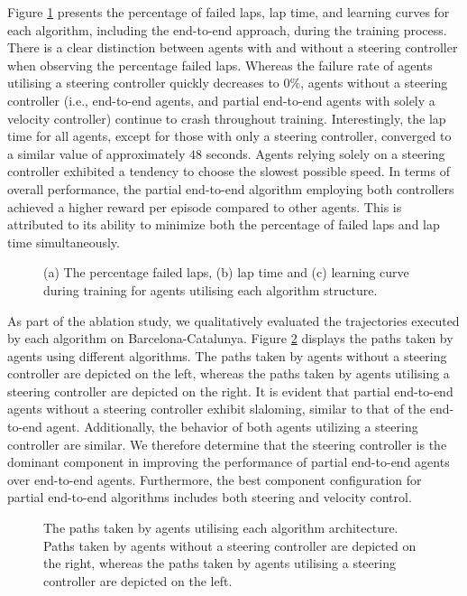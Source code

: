 Figure \ref{fig:architecture_train} presents the percentage of failed laps, lap time, and learning curves for each algorithm, including the end-to-end approach, during the training process.
There is a clear distinction between agents with and without a steering controller when observing the percentage failed laps.
Whereas the failure rate of agents utilising a steering controller quickly decreases to $0\%$, agents without a steering controller (i.e., end-to-end agents, and partial end-to-end agents with solely a velocity controller) continue to crash throughout training.
Interestingly, the lap time for all agents, except for those with only a steering controller, converged to a similar value of approximately $48$ seconds. 
Agents relying solely on a steering controller exhibited a tendency to choose the slowest possible speed.
In terms of overall performance, the partial end-to-end algorithm employing both controllers achieved a higher reward per episode compared to other agents. 
This is attributed to its ability to minimize both the percentage of failed laps and lap time simultaneously.


\begin{figure}[htb!]
    \centering
    
    \caption[Learning curves for agents utilising each algorithm structure]{(a) The percentage failed laps, (b) lap time and (c) learning curve during training for agents utilising each algorithm structure.}
    \label{fig:architecture_train}
\end{figure}

As part of the ablation study, we qualitatively evaluated the trajectories executed by each algorithm on Barcelona-Catalunya.
Figure \ref{fig:architecture_esp} displays the paths taken by agents using different algorithms.
The paths taken by agents without a steering controller are depicted on the left, whereas the paths taken by agents utilising a steering controller are depicted on the right.
It is evident that partial end-to-end agents without a steering controller exhibit slaloming, similar to that of the end-to-end agent. 
Additionally, the behavior of both agents utilizing a steering controller are similar.
We therefore determine that the steering controller is the dominant component in improving the performance of partial end-to-end agents over end-to-end agents. 
Furthermore, the best component configuration for partial end-to-end algorithms includes both steering and velocity control.


\begin{figure}[htb!]
    \centering
    
    \caption[Paths taken by agents utilising each algorithm architecture]{The paths taken by agents utilising each algorithm architecture. Paths taken by agents without a steering controller are depicted on the right, whereas the paths taken by agents utilising a steering controller are depicted on the left.}
    \label{fig:architecture_esp}
\end{figure}


